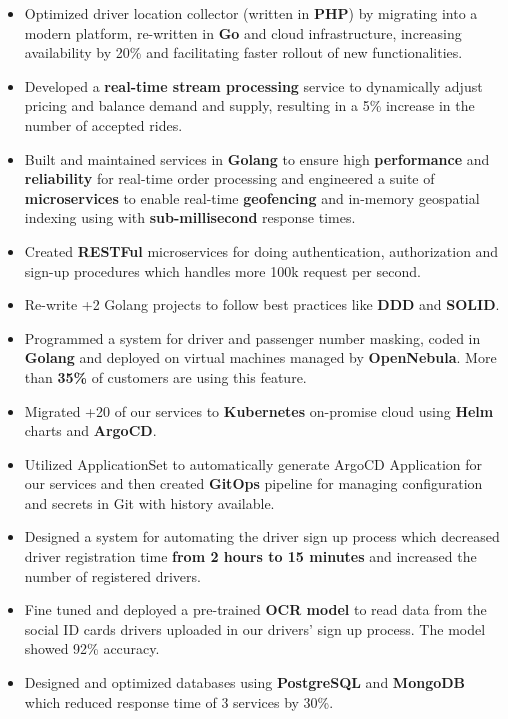 \vspace{0.5cm}

\begin{itemize}
      \item Optimized driver location collector (written in \textbf{PHP}) by migrating into a modern platform, re-written in \textbf{Go} and cloud infrastructure,
            increasing availability by 20\% and facilitating faster rollout of new functionalities.
      \item Developed a \textbf{real-time stream processing} service to dynamically adjust pricing and balance demand and supply,
            resulting in a 5\% increase in the number of accepted rides.
      \item Built and maintained services in \textbf{Golang} to ensure
            high \textbf{performance} and \textbf{reliability} for real-time order processing
            and engineered a suite of \textbf{microservices} to enable real-time \textbf{geofencing} and in-memory geospatial
            indexing using  with \textbf{sub-millisecond} response times.
      \item Created \textbf{RESTFul} microservices for doing authentication, authorization and sign-up procedures which handles more 100k request per second.
      \item Re-write +2 Golang projects to follow best practices like \textbf{DDD} and \textbf{SOLID}.
      \item Programmed a system for driver and passenger number masking, coded in \textbf{Golang}
            and deployed on virtual machines managed by \textbf{OpenNebula}. More than \textbf{35\%} of customers are using this feature.
      \item Migrated +20 of our services to \textbf{Kubernetes} on-promise cloud using \textbf{Helm} charts and \textbf{ArgoCD}.
      \item Utilized  ApplicationSet to automatically generate ArgoCD Application
            for our services and then created \textbf{GitOps} pipeline for managing configuration
            and secrets in Git with history available.
      \item Designed a system for automating the driver sign up process which decreased driver registration time \textbf{from 2 hours to 15 minutes} and increased the number of registered drivers.
      \item Fine tuned and deployed a pre-trained \textbf{OCR model} to read data from the social ID cards drivers uploaded in our drivers' sign up process. The model showed 92\% accuracy.
      \item Designed and optimized databases using \textbf{PostgreSQL} and \textbf{MongoDB} which reduced response time of 3 services by 30\%.
\end{itemize}

